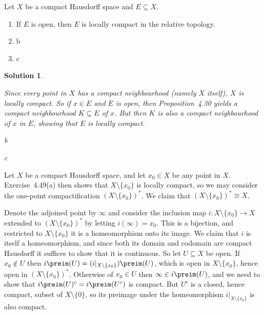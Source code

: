 \documentclass[article, a4paper, 11pt, oneside]{memoir}
\numberwithin{equation}{chapter}
\theoremstyle{nonumberplain}
\newtheorem{solution}{Solution}
\begin{document}
\begin{exerciseframed*}[49]
	Let $X$ be a compact Hausdorff space and $E \subseteq X$.
	\begin{enumerate}
		\item If $E$ is open, then $E$ is locally compact in the relative topology.
		\item b
		\item c
	\end{enumerate}
\end{exerciseframed*}

\begin{solution}
\begin{solutionsec}
	\item Since every point in $X$ has a compact neighbourhood (namely $X$ itself), $X$ is locally compact. So if $x \in E$ and $E$ is open, then Proposition~4.30 yields a compact neighbourhood $K \subseteq E$ of $x$. But then $K$ is also a compact neighbourhood of $x$ in $E$, showing that $E$ is locally compact.
	
	\item b
	\item c
\end{solutionsec}
\end{solution}


\begin{remark}
	\label{rem:one-point-compactification}
	Let $X$ be a compact Hausdorff space, and let $x_0 \in X$ be any point in $X$. Exercise~4.49(a) then shows that $X \setminus \{x_0\}$ is locally compact, so we may consider the one-point compactification $(X \setminus \{x_0\})^*$. We claim that $(X \setminus \{x_0\})^* \cong X$.
	
	Denote the adjoined point by $\infty$ and consider the inclusion map $i \colon X \setminus \{x_0\} \to X$ extended to $(X \setminus \{x_0\})^*$ by letting $i(\infty) = x_0$. This is a bijection, and restricted to $X \setminus \{x_0\}$ it is a homeomorphism onto its image. We claim that $i$ is itself a homeomorphism, and since both its domain and codomain are compact Hausdorff it suffices to show that it is continuous. So let $U \subseteq X$ be open. If $x_0 \not\in U$ then $i\preim(U) = (i|_{X \setminus \{x_0\}})\preim(U)$, which is open in $X \setminus \{x_0\}$, hence open in $(X \setminus \{x_0\})^*$. Otherwise of $x_0 \in U$ then $\infty \in i\preim(U)$, and we need to show that $i\preim(U)^c = i\preim(U^c)$ is compact. But $U^c$ is a closed, hence compact, subset of $X \setminus \{0\}$, so its preimage under the homeomorphism $i|_{X \setminus \{x_0\}}$ is also compact.
\end{remark}
\end{document}
